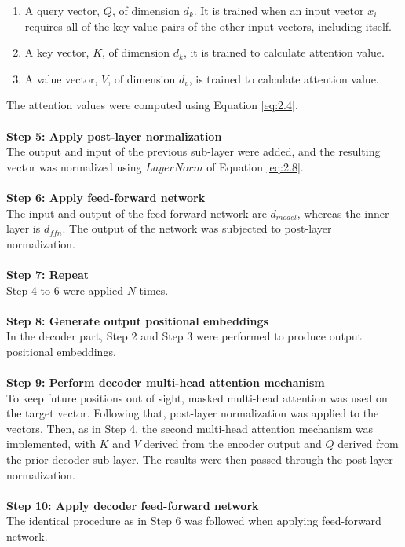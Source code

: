 {\begin{enumerate}[nosep, label=\roman*.]
\item A query vector, $Q$, of dimension $d_k$. It is trained when an input vector $x_i$ requires all of the key-value pairs of the other input vectors, including itself. 
\item A key vector, $K$, of dimension $d_k$, it is trained to calculate attention value.
\item A value vector, $V$, of dimension $d_v$, is trained to calculate attention value.
\end{enumerate}
The attention values were computed using Equation \ref{eq:2.4}.
\\\\
\textbf{Step 5: Apply post-layer normalization}\\
The output and input of the previous sub-layer were added, and the resulting vector was normalized using $LayerNorm$ of Equation \ref{eq:2.8}.\\\\
\textbf{Step 6: Apply feed-forward network} \\
The input and output of the feed-forward network are $d_{model}$, whereas the inner layer is $d_{ffn}$. The output of the network was subjected to post-layer normalization.
\\\\
\textbf{Step 7: Repeat} \\
Step 4 to 6 were applied $N$ times.
\\\\
\textbf{Step 8: Generate output positional embeddings} \\
In the decoder part, Step 2 and Step 3 were performed to produce output positional embeddings.
\\\\
\textbf{Step 9: Perform decoder multi-head attention mechanism} \\
To keep future positions out of sight, masked multi-head attention was used on the target vector. Following that, post-layer normalization was applied to the vectors. Then, as in Step 4, the second multi-head attention mechanism was implemented, with $K$ and $V$ derived from the encoder output and $Q$ derived from the prior decoder sub-layer. The results were then passed through the post-layer normalization. 
\\\\
\textbf{Step 10: Apply decoder feed-forward network} \\
The identical procedure as in Step 6 was followed when applying feed-forward network. 
}
